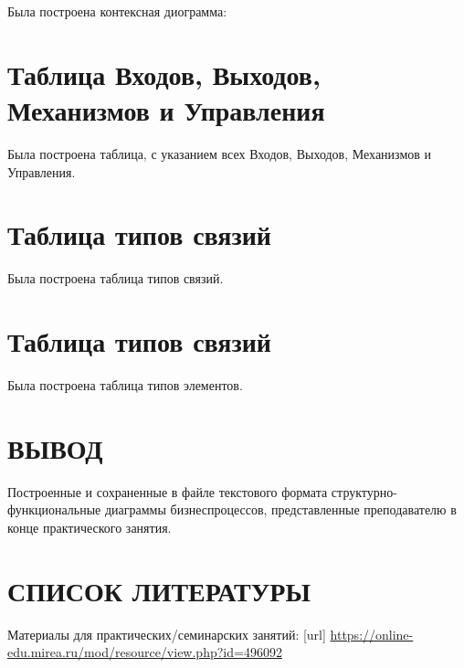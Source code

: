 Была построена контексная диограмма:


\newpage

\section{Таблица Входов, Выходов, Механизмов и Управления}
Была построена таблица, с указанием всех Входов, Выходов, Механизмов и Управления.




\newpage

\section{Таблица типов связий}

Была построена таблица типов связий.



\newpage

\section{Таблица типов связий}

Была построена таблица типов элементов.




\newpage

\section*{ВЫВОД}
Построенные и сохраненные в
файле текстового формата структурно-функциональные диаграммы бизнеспроцессов,
представленные преподавателю в конце практического занятия.

\section*{СПИСОК ЛИТЕРАТУРЫ}
\begin{thebibliography}{}
	\bibitem{}  Материалы для практических/семинарских занятий: [url]
	\url{https://online-edu.mirea.ru/mod/resource/view.php?id=496092}
\end{thebibliography}
